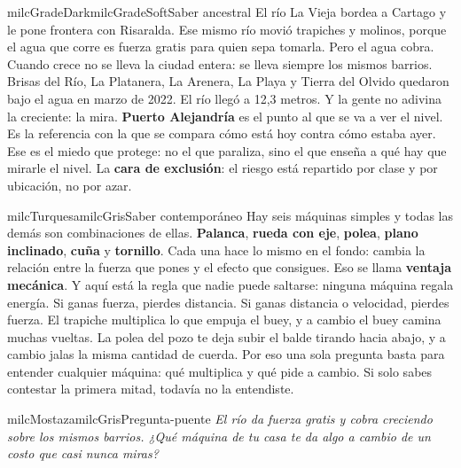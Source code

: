 \documentclass[11pt,letterpaper]{article}
\begin{document}
\begin{softbox}{milcGradeDark}{milcGradeSoft}{Saber ancestral}
El río La Vieja bordea a Cartago y le pone frontera con Risaralda. Ese mismo río movió trapiches y molinos, porque el agua que corre es fuerza gratis para quien sepa tomarla. Pero el agua cobra. Cuando crece no se lleva la ciudad entera: se lleva siempre los mismos barrios. Brisas del Río, La Platanera, La Arenera, La Playa y Tierra del Olvido quedaron bajo el agua en marzo de 2022. El río llegó a 12,3 metros. Y la gente no adivina la creciente: la mira. \textbf{Puerto Alejandría} es el punto al que se va a ver el nivel. Es la referencia con la que se compara cómo está hoy contra cómo estaba ayer. Ese es el miedo que protege: no el que paraliza, sino el que enseña a qué hay que mirarle el nivel. La \textbf{cara de exclusión}: el riesgo está repartido por clase y por ubicación, no por azar.\par{}
\end{softbox}

\begin{softbox}{milcTurquesa}{milcGris}{Saber contemporáneo}
Hay seis máquinas simples y todas las demás son combinaciones de ellas. \textbf{Palanca}, \textbf{rueda con eje}, \textbf{polea}, \textbf{plano inclinado}, \textbf{cuña} y \textbf{tornillo}. Cada una hace lo mismo en el fondo: cambia la relación entre la fuerza que pones y el efecto que consigues. Eso se llama \textbf{ventaja mecánica}. Y aquí está la regla que nadie puede saltarse: ninguna máquina regala energía. Si ganas fuerza, pierdes distancia. Si ganas distancia o velocidad, pierdes fuerza. El trapiche multiplica lo que empuja el buey, y a cambio el buey camina muchas vueltas. La polea del pozo te deja subir el balde tirando hacia abajo, y a cambio jalas la misma cantidad de cuerda. Por eso una sola pregunta basta para entender cualquier máquina: qué multiplica y qué pide a cambio. Si solo sabes contestar la primera mitad, todavía no la entendiste.
\end{softbox}

\begin{softbox}{milcMostaza}{milcGris}{Pregunta-puente}
\textit{El río da fuerza gratis y cobra creciendo sobre los mismos barrios. ¿Qué máquina de tu casa te da algo a cambio de un costo que casi nunca miras?}
\end{softbox}
\end{document}
